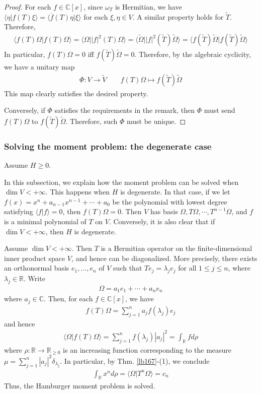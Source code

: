 \documentclass[12pt,b5paper,notitlepage]{article}
\theoremstyle{definition}
\theoremstyle{plain}
\newcommand{\wtd}{\widetilde}
\newcommand{\ovl}{\overline}
\newcommand{\bk}[1]{\langle {#1}\rangle}
\newcommand{\bigbk}[1]{\big\langle {#1}\big\rangle}
\newcommand{\Cbb}{\mathbb C}
\newcommand{\Rbb}{\mathbb R}
\numberwithin{equation}{section}
\begin{document}
\begin{proof}
For each $f\in\Cbb[x]$, since $\omega_T$ is Hermitian, we have $\bk{\eta|f(T)\xi}=\bk{\ovl f(T)\eta|\xi}$ for each $\xi,\eta\in V$. A similar property holds for $\wtd T$. Therefore, 
\begin{align*}
\bigbk{f(T)\Omega\big|f(T)\Omega}=\bigbk{\Omega\big||f|^2(T)\Omega}=\bigbk{\wtd\Omega\big||f|^2(\wtd T)\wtd\Omega}=\bigbk{f(\wtd T)\wtd\Omega\big|f(\wtd T)\wtd\Omega}
\end{align*}
In particular, $f(T)\Omega=0$ iff $f(\wtd T)\wtd\Omega=0$. Therefore, by the algebraic cyclicity, we have a unitary map
\begin{align}
\Phi:V\rightarrow\wtd V\qquad f(T)\Omega\mapsto f(\wtd T)\wtd\Omega
\end{align}
This map clearly satisfies the desired property.

Conversely, if $\Phi$ satisfies the requirements in the remark, then $\Phi$ must send $f(T)\Omega$ to $f(\wtd T)\wtd\Omega$. Therefore, such $\Phi$ must be unique. 
\end{proof}



\subsubsection{Solving the moment problem: the degenerate case}

Assume $H\geq0$.

In this subsection, we explain how the moment problem can be solved when $\dim V<+\infty$. This happens when $H$ is degenerate. In that case, if we let $f(x)=x^n+a_{n-1}x^{n-1}+\cdots+a_0$ be the polynomial with lowest degree satisfying $\bk{f|f}=0$, then $f(T)\Omega=0$. Then $V$ has basis $\Omega,T\Omega,\cdots,T^{n-1}\Omega$, and $f$ is a minimal polynomial of $T$ on $V$. Conversely, it is also clear that if $\dim V<+\infty$, then $H$ is degenerate.


Assume $\dim V<+\infty$. Then $T$ is a Hermitian operator on the finite-dimensional inner product space $V$, and hence can be diagonalized. More precisely, there exists an orthonormal basis $e_1,\dots,e_n$ of $V$ such that $Te_j=\lambda_je_j$ for all $1\leq j\leq n$, where $\lambda_j\in\Rbb$. Write
\begin{align*}
\Omega=a_1e_1+\cdots+a_ne_n
\end{align*}
where $a_j\in\Cbb$. Then, for each $f\in\Cbb[x]$, we have
\begin{align*}
f(T)\Omega=\sum_{j=1}^n a_jf(\lambda_j)e_j
\end{align*}
and hence
\begin{align*}
\bk{\Omega|f(T)\Omega}=\sum_{j=1}^n f(\lambda_j)|a_j|^2=\int_\Rbb fd\rho
\end{align*}
where $\rho:\Rbb\rightarrow\Rbb_{\geq0}$ is an increasing function corresponding to the measure $\mu=\sum_{j=1}^n |a_j|^2\delta_{\lambda_j}$. In particular, by Thm. \ref{lb167}-(1), we conclude
\begin{align*}
\int_\Rbb x^nd\rho=\bk{\Omega|T^n\Omega}=c_n
\end{align*}
Thus, the Hamburger moment problem is solved.
\end{document}
